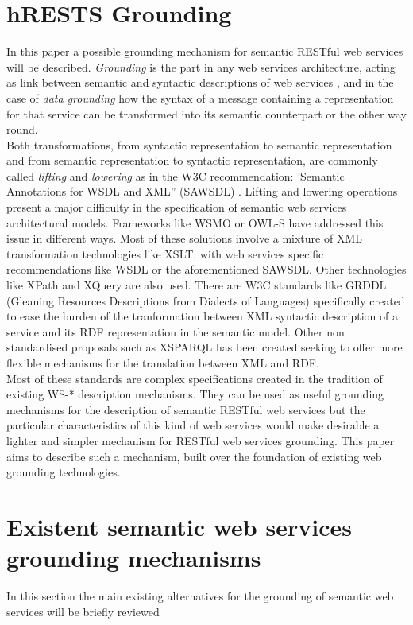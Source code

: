 \section{hRESTS Grounding}
In this paper a possible grounding mechanism for semantic RESTful web services will be described. \emph{Grounding} is the part in any web services architecture, acting as link between semantic and syntactic descriptions of web services \cite{ISBN:3540345191}, and in the case of \emph{data grounding} how the syntax of a message containing  a representation for that service can be transformed into its semantic counterpart or the other way round.\\
Both transformations, from syntactic representation to semantic representation and from semantic representation to syntactic representation, are commonly called \emph{lifting} and \emph{lowering} as in the W3C recommendation: 'Semantic Annotations for WSDL and XML'' (SAWSDL)  \cite{Lausen:07:SAW}. Lifting and lowering operations present a major difficulty in the specification of semantic web services architectural models. Frameworks like WSMO \cite{wsmo} or OWL-S  \cite{owls} have addressed this issue in different ways. Most of these solutions involve a mixture of XML transformation technologies like XSLT, with web services specific recommendations like WSDL \cite{w3cwsdl} or the aforementioned SAWSDL. Other technologies like XPath \cite{xpath} and XQuery \cite{xquery} are also used. There are  W3C standards like GRDDL (Gleaning Resources Descriptions from Dialects of Languages) \cite{Connolly:07:GRD} specifically created to ease the burden of the tranformation between XML syntactic description of a service and its RDF representation in the semantic model. Other non standardised proposals such as XSPARQL \cite{xsparql} has been created seeking to offer more flexible mechanisms for the translation between XML and RDF.\\
Most of these standards are complex specifications created in the tradition of existing WS-* description mechanisms. They can be used as useful grounding mechanisms for the description of semantic RESTful web services but the particular characteristics of this kind of web services would make desirable a lighter and simpler mechanism for RESTful web services grounding. This paper aims to describe such a mechanism, built over the foundation of existing web grounding technologies.\\

\section{Existent semantic web services grounding mechanisms}
In this section the main existing alternatives for the grounding of semantic web services will be briefly reviewed

